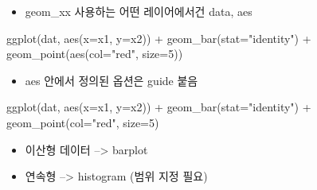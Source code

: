 \documentclass[
]{book}
\newenvironment{Shaded}{\begin{snugshade}}{\end{snugshade}}
\newcommand{\AttributeTok}[1]{\textcolor[rgb]{0.77,0.63,0.00}{#1}}
\newcommand{\DecValTok}[1]{\textcolor[rgb]{0.00,0.00,0.81}{#1}}
\newcommand{\FunctionTok}[1]{\textcolor[rgb]{0.00,0.00,0.00}{#1}}
\newcommand{\NormalTok}[1]{#1}
\newcommand{\SpecialCharTok}[1]{\textcolor[rgb]{0.00,0.00,0.00}{#1}}
\newcommand{\StringTok}[1]{\textcolor[rgb]{0.31,0.60,0.02}{#1}}
\providecommand{\tightlist}{%
  \setlength{\itemsep}{0pt}\setlength{\parskip}{0pt}}
\begin{document}
\begin{itemize}
\tightlist
\item
  geom\_xx 사용하는 어떤 레이어에서건 data, aes
\end{itemize}

\begin{Shaded}
\begin{Highlighting}[]
\FunctionTok{ggplot}\NormalTok{(dat, }\FunctionTok{aes}\NormalTok{(}\AttributeTok{x=}\NormalTok{x1, }\AttributeTok{y=}\NormalTok{x2)) }\SpecialCharTok{+}
  \FunctionTok{geom\_bar}\NormalTok{(}\AttributeTok{stat=}\StringTok{"identity"}\NormalTok{) }\SpecialCharTok{+}
  \FunctionTok{geom\_point}\NormalTok{(}\FunctionTok{aes}\NormalTok{(}\AttributeTok{col=}\StringTok{"red"}\NormalTok{, }\AttributeTok{size=}\DecValTok{5}\NormalTok{))}
\end{Highlighting}
\end{Shaded}

\begin{itemize}
\tightlist
\item
  aes 안에서 정의된 옵션은 guide 붙음
\end{itemize}

\begin{Shaded}
\begin{Highlighting}[]
\FunctionTok{ggplot}\NormalTok{(dat, }\FunctionTok{aes}\NormalTok{(}\AttributeTok{x=}\NormalTok{x1, }\AttributeTok{y=}\NormalTok{x2)) }\SpecialCharTok{+}
  \FunctionTok{geom\_bar}\NormalTok{(}\AttributeTok{stat=}\StringTok{"identity"}\NormalTok{) }\SpecialCharTok{+}
  \FunctionTok{geom\_point}\NormalTok{(}\AttributeTok{col=}\StringTok{"red"}\NormalTok{, }\AttributeTok{size=}\DecValTok{5}\NormalTok{)}
\end{Highlighting}
\end{Shaded}

\begin{itemize}
\tightlist
\item
  이산형 데이터 --\textgreater{} barplot
\item
  연속형 --\textgreater{} histogram (범위 지정 필요)
\end{itemize}
\end{document}
